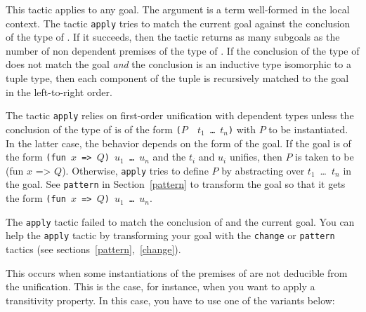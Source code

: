 This tactic applies to any goal.  The argument {\term} is a term
well-formed in the local context.  The tactic {\tt apply} tries to
match the current goal against the conclusion of the type of {\term}.
If it succeeds, then the tactic returns as many subgoals as the number
of non dependent premises of the type of {\term}. If the conclusion of
the type of {\term} does not match the goal {\em and} the conclusion
is an inductive type isomorphic to a tuple type, then each component
of the tuple is recursively matched to the goal in the left-to-right
order.

The tactic {\tt apply} relies on first-order unification with
dependent types unless the conclusion of the type of {\term} is of the
form {\tt ($P$~ $t_1$~\ldots ~$t_n$)} with $P$ to be instantiated.  In
the latter case, the behavior depends on the form of the goal. If the
goal is of the form {\tt (fun $x$ => $Q$)~$u_1$~\ldots~$u_n$} and the
$t_i$ and $u_i$ unifies, then $P$ is taken to be (fun $x$ => $Q$).
Otherwise, {\tt apply} tries to define $P$ by abstracting over
$t_1$~\ldots ~$t_n$ in the goal. See {\tt pattern} in
Section~\ref{pattern} to transform the goal so that it gets the form
{\tt (fun $x$ => $Q$)~$u_1$~\ldots~$u_n$}.

\begin{ErrMsgs}
\item {} 

  The {\tt apply}
  tactic failed to match the conclusion of {\term} and the current goal.
  You can help the {\tt apply} tactic by transforming your
  goal with the {\tt change} or {\tt pattern} tactics (see 
  sections~\ref{pattern},~\ref{change}).

\item {}

  This occurs when some instantiations of the premises of {\term} are not
  deducible from the unification. This is the case, for instance, when
  you want to apply a transitivity property. In this case, you have to
  use one of the variants below:

\end{ErrMsgs}

